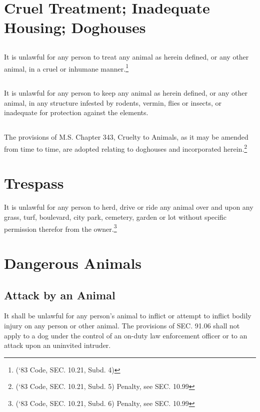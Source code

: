 \section{Cruel Treatment; Inadequate Housing; Doghouses}
\subsection{}
It is unlawful for any person to treat any animal as herein defined, or any other animal, in a cruel or inhumane manner.\footnote{(‘83 Code, SEC. 10.21, Subd. 4)}
\subsection{}
It is unlawful for any person to keep any animal as herein defined, or any other animal, in any structure infested by rodents, vermin, flies or insects, or inadequate for protection against the elements.
\subsection{}
The provisions of M.S. Chapter 343, Cruelty to Animals, as it may be amended from time to time, are adopted relating to doghouses and incorporated herein.\footnote{(‘83 Code, SEC. 10.21, Subd. 5)  Penalty, see SEC. 10.99}

\section{Trespass}
It is unlawful for any person to herd, drive or ride any animal over and upon any grass, turf, boulevard, city park, cemetery, garden or lot without specific permission therefor from the owner.\footnote{(‘83 Code, SEC. 10.21, Subd. 6)  Penalty, see SEC. 10.99}

\section{Dangerous Animals}
\subsection{Attack by an Animal}
It shall be unlawful for any person’s animal to inflict or attempt to inflict bodily injury on any person or other animal. The provisions of SEC. 91.06 shall not apply to a dog under the control of an on-duty law enforcement officer or to an attack upon an uninvited intruder.
